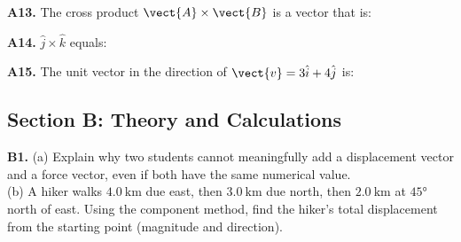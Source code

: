 \begin{exercisebox}[2]

\vspace{0.4cm}

\textbf{A13.} The cross product $\vect{A}\times\vect{B}$
is a vector that is:


\vspace{0.4cm}

\textbf{A14.} $\hat{j}\times\hat{k}$ equals:


\vspace{0.4cm}

\textbf{A15.} The unit vector in the direction of
$\vect{v} = 3\hat{i} + 4\hat{j}$ is:


\vspace{0.6cm}

\subsection*{Section B: Theory and Calculations}

\textbf{B1.}
(a) Explain why two students cannot meaningfully add a
displacement vector and a force vector, even if both have
the same numerical value.\\[4pt]
(b) A hiker walks $4.0\ \text{km}$ due east, then
$3.0\ \text{km}$ due north, then $2.0\ \text{km}$ at
$45°$ north of east. Using the component method, find
the hiker's total displacement from the starting point
(magnitude and direction).
\hfill{}

\vspace{0.4cm}


\end{exercisebox}

